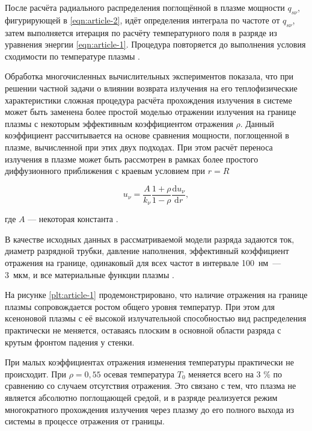 После расчёта радиального распределения поглощённой в плазме мощности $q_{s\nu}$, фигурирующей в \eqref{eqn:article-2}, идёт определения интеграла по частоте от $q_{s\nu}$, затем выполняется итерация по расчёту температурного поля в разряде из уравнения энергии \eqref{eqn:article-1}.
Процедура повторяется до выполнения условия сходимости по температуре плазмы \cite{article-5-kalitkin}.

Обработка многочисленных вычислительных экспериментов \cite{gradov-dissertation, article-6-gradov} показала, что при решении частной задачи о влиянии возврата излучения на его теплофизические характеристики сложная процедура расчёта прохождения излучения в системе может быть заменена более простой моделью отражении излучения на границе плазмы с некоторым эффективным коэффициентом отражения $\rho$.
Данный коэффициент рассчитывается на основе сравнения мощности, поглощенной в плазме, вычисленной при этих двух подходах.
При этом расчёт переноса излучения в плазме может быть рассмотрен в рамках более простого диффузионного приближения \cite{gradov-dissertation, article-6-gradov, article-7-zeldovich} с краевым условием при $r = R$

\begin{equation}
	u_\nu = \frac{A}{k_\nu} \frac{1 + \rho}{1 - \rho} \frac{\mathrm du_\nu}{\mathrm dr},
\end{equation}

\noindent где $A$ — некоторая константа \cite{gradov-dissertation, article-6-gradov}.

В качестве исходных данных в рассматриваемой модели разряда задаются ток, диаметр разрядной трубки, давление наполнения, эффективный коэффициент отражения на границе, одинаковый для всех частот в интервале 100~нм~— 3~мкм, и все материальные функции плазмы \cite{article-8-gradov, article-9-gradov}.

На рисунке \ref{plt:article-1} продемонстрировано, что наличие отражения на границе плазмы сопровождается ростом общего уровня температур.
При этом для ксеноновой плазмы с её высокой излучательной способностью вид распределения практически не меняется, оставаясь плоским в основной области разряда с крутым фронтом падения у стенки.


При малых коэффициентах отражения изменения температуры практически не происходит.
При $\rho = 0,55$ осевая температура $T_0$ меняется всего на 3 \% по сравнению со случаем отсутствия отражения.
Это связано с тем, что плазма не является абсолютно поглощающей средой, и в разряде реализуется режим многократного прохождения излучения через плазму до его полного выхода из системы в процессе отражения от границы.


